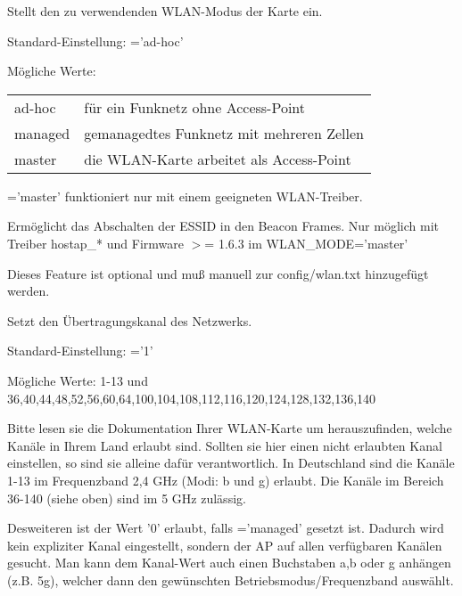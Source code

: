 \begin{description}

        Stellt den zu verwendenden WLAN-Modus der Karte ein.

        Standard-Einstellung: ='ad-hoc'

        Mögliche Werte:

        \begin{tabular}[h]{ll}
            ad-hoc        & für ein Funknetz ohne Access-Point \\
            managed       & gemanagedtes Funknetz mit mehreren Zellen\\
            master        & die WLAN-Karte arbeitet als Access-Point\\
        \end{tabular}

        ='master' funktioniert nur mit einem geeigneten WLAN-Treiber.


        Ermöglicht das Abschalten der ESSID in den Beacon Frames.
        Nur möglich mit Treiber hostap\_* und Firmware $>$= 1.6.3 im WLAN\_MODE='master'

        Dieses Feature ist optional und muß manuell zur config/wlan.txt hinzugefügt werden.


        Setzt den Übertragungskanal des Netzwerks.

        Standard-Einstellung: ='1'

        Mögliche Werte: 1-13 und 36,40,44,48,52,56,60,64,100,104,108,112,116,120,124,128,132,136,140

        Bitte lesen sie die Dokumentation Ihrer WLAN-Karte um herauszufinden,
        welche Kanäle in Ihrem Land erlaubt sind.
        Sollten sie hier einen nicht erlaubten Kanal einstellen, so sind sie alleine dafür
        verantwortlich. In Deutschland sind die Kanäle 1-13 im Frequenzband 2,4 GHz (Modi: b und g) erlaubt.
        Die Kanäle im Bereich 36-140 (siehe oben) sind im 5 GHz zulässig.
    
        Desweiteren ist der Wert '0' erlaubt, falls ='managed' gesetzt ist.
        Dadurch wird kein expliziter Kanal eingestellt, sondern der AP auf allen
        verfügbaren Kanälen gesucht.
        Man kann dem Kanal-Wert auch einen Buchstaben a,b oder g anhängen (z.B. 5g), welcher dann
        den gewünschten Betriebsmodus/Frequenzband auswählt.


\end{description}
